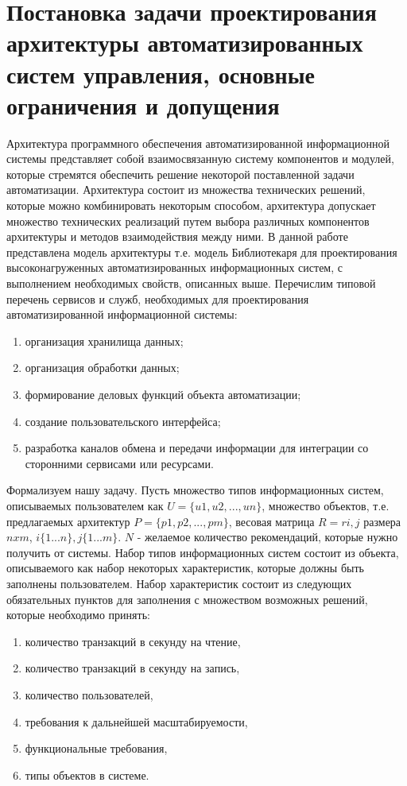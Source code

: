 \section{Постановка задачи проектирования архитектуры автоматизированных систем управления, основные ограничения и допущения}\label{sec:ch2/sec2}
Архитектура программного обеспечения автоматизированной информационной системы представляет собой взаимосвязанную систему компонентов и модулей, которые стремятся обеспечить решение некоторой поставленной задачи автоматизации. Архитектура состоит из множества технических решений, которые можно комбинировать некоторым способом, архитектура допускает множество технических реализаций путем выбора различных компонентов архитектуры и методов взаимодействия между ними. В данной работе представлена модель архитектуры т.е. модель Библиотекаря для проектирования высоконагруженных автоматизированных информационных систем, с выполнением необходимых свойств, описанных выше.  
Перечислим типовой перечень сервисов и служб, необходимых для проектирования автоматизированной информационной системы:
\begin{enumerate}
	\item организация хранилища данных;
	\item организация обработки данных;
	\item формирование деловых функций объекта автоматизации;
	\item создание пользовательского интерфейса;
	\item разработка каналов обмена и передачи информации для интеграции со сторонними сервисами или ресурсами.
\end{enumerate}
Формализуем нашу задачу. Пусть множество типов информационных систем, описываемых пользователем как  $U=\{u1,u2,...,un\}$, множество объектов, т.е. предлагаемых архитектур $P=\{p1,p2,...,pm\}$, весовая матрица  $R=ri,j$ размера $nxm$,  $i\{1...n\},j\{1...m\}$. $N$ - желаемое количество рекомендаций, которые нужно получить от системы. Набор типов информационных систем состоит из объекта, описываемого как набор некоторых характеристик, которые должны быть заполнены пользователем. Набор характеристик состоит из следующих обязательных пунктов для заполнения с множеством возможных решений, которые необходимо принять:
\begin{enumerate}
\item количество транзакций в секунду на чтение,
\item количество транзакций в секунду на запись,
\item количество пользователей,
\item требования к дальнейшей масштабируемости,
\item функциональные требования,
\item типы объектов в системе.
\end{enumerate}
